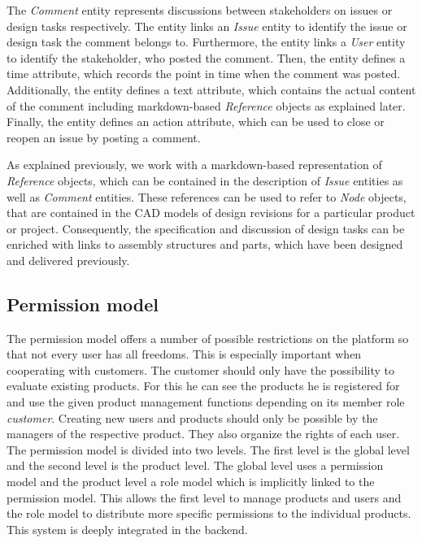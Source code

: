 The \textit{Comment} entity represents discussions between stakeholders on issues or design tasks respectively.
The entity links an \textit{Issue} entity to identify the issue or design task the comment belongs to.
Furthermore, the entity links a \textit{User} entity to identify the stakeholder, who posted the comment.
Then, the entity defines a time attribute, which records the point in time when the comment was posted.
Additionally, the entity defines a text attribute, which contains the actual content of the comment including markdown-based \textit{Reference} objects as explained later.
Finally, the entity defines an action attribute, which can be used to close or reopen an issue by posting a comment.

As explained previously, we work with a markdown-based representation of \textit{Reference} objects, which can be contained in the description of \textit{Issue} entities as well as \textit{Comment} entities.
These references can be used to refer to \textit{Node} objects, that are contained in the CAD models of design revisions for a particular product or project.
Consequently, the specification and discussion of design tasks can be enriched with links to assembly structures and parts, which have been designed and delivered previously.

\subsection{Permission model}

\label{subsec:permissionModel}
The permission model offers a number of possible restrictions on the platform so that not every user has all freedoms. This is especially important when cooperating with customers. The customer should only have the possibility to evaluate existing products. For this he can see the products he is registered for and use the given product management functions depending on its member role \textit{customer}. Creating new users and products should only be possible by the managers of the respective product. They also organize the rights of each user. The permission model is divided into two levels. The first level is the global level and the second level is the product level. The global level uses a permission model and the product level a role model which is implicitly linked to the permission model. 
This allows the first level to manage products and users and the role model to distribute more specific permissions to the individual products. This system is deeply integrated in the backend.

